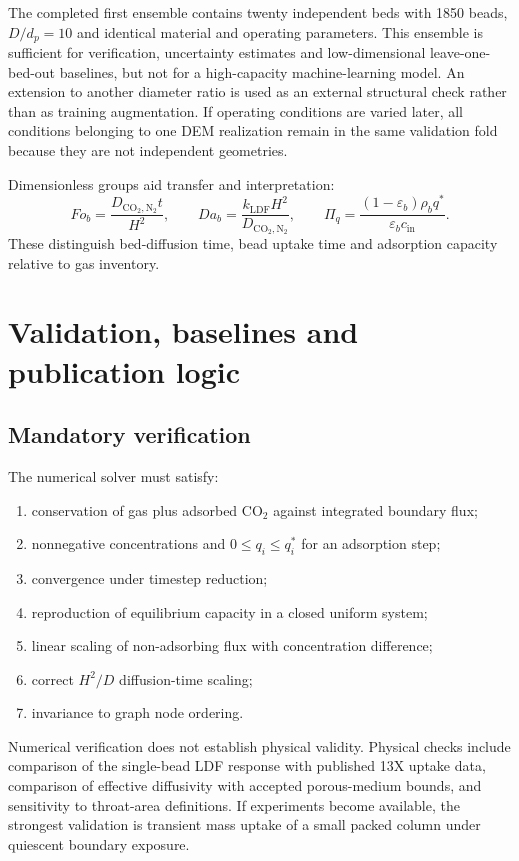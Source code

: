 \documentclass[12pt,a4paper]{article}
\begin{document}
The completed first ensemble contains twenty independent beds with 1850 beads,
$D/d_p=10$ and identical material and operating parameters. This ensemble is
sufficient for verification, uncertainty estimates and low-dimensional
leave-one-bed-out baselines, but not for a high-capacity machine-learning model.
An extension to another diameter ratio is used as an external structural check
rather than as training augmentation. If operating conditions are varied later,
all conditions belonging to one DEM realization remain in the same validation
fold because they are not independent geometries.

Dimensionless groups aid transfer and interpretation:
\begin{equation}
 Fo_b=\frac{D_{\mathrm{CO_2,N_2}}t}{H^2},
 \qquad
 Da_b=\frac{k_{\mathrm{LDF}}H^2}
 {D_{\mathrm{CO_2,N_2}}},
 \qquad
 \Pi_q=\frac{(1-\varepsilon_b)\rho_b q^*}
 {\varepsilon_b c_{\mathrm{in}}}.
\end{equation}
These distinguish bed-diffusion time, bead uptake time and adsorption capacity
relative to gas inventory.

\section{Validation, baselines and publication logic}

\subsection{Mandatory verification}

The numerical solver must satisfy:
\begin{enumerate}
 \item conservation of gas plus adsorbed CO$_2$ against integrated boundary flux;
 \item nonnegative concentrations and $0\le q_i\le q_i^*$ for an adsorption step;
 \item convergence under timestep reduction;
 \item reproduction of equilibrium capacity in a closed uniform system;
 \item linear scaling of non-adsorbing flux with concentration difference;
 \item correct $H^2/D$ diffusion-time scaling;
 \item invariance to graph node ordering.
\end{enumerate}

Numerical verification does not establish physical validity. Physical checks
include comparison of the single-bead LDF response with published 13X uptake
data, comparison of effective diffusivity with accepted porous-medium bounds,
and sensitivity to throat-area definitions. If experiments become available,
the strongest validation is transient mass uptake of a small packed column
under quiescent boundary exposure.
\end{document}
